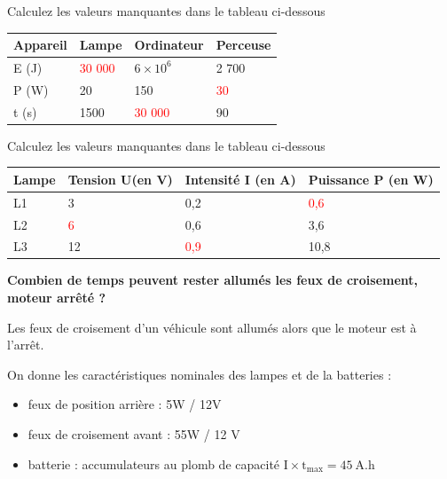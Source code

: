 \documentclass[11pt,a4paper]{article}
\begin{document}
 Calculez les valeurs manquantes dans le tableau ci-dessous \\\begin{center}
    

    \begin{tabular}{|p{3cm}|C{2cm}|C{2cm}|C{2cm}|}
         \hline
         Appareil & Lampe & Ordinateur & Perceuse \\
         \hline 
         E (J) & \textcolor{red}{30 000}  & $6\times10^6$ & 2 700 \\
         \hline
         P (W) & 20 & 150 & \textcolor{red}{30} \\
         \hline 
         t (s) & 1500 & \textcolor{red}{30 000} & 90 \\
         \hline
         

    \end{tabular}\end{center}

    \vfill 
    
 Calculez les valeurs manquantes dans le tableau ci-dessous \\\begin{center}
    

    \begin{tabular}{|p{2cm}|C{2cm}|C{2cm}|C{2cm}|}
         \hline
         Lampe & Tension U(en V) & Intensité I (en A)  & Puissance P (en W) \\
         \hline 
         L1 &  3 & 0,2  & \textcolor{red}{0,6} \\
         \hline
         L2 & \textcolor{red}{6} & 0,6 & 3,6 \\
         \hline 
         L3 & 12 & \textcolor{red}{0,9} & 10,8 \\
         \hline
         

    \end{tabular}\end{center}
\newpage

\begin{center}
    
\textbf{Combien de temps peuvent rester allumés les feux de croisement, moteur arrêté ? }
\end{center}

Les feux de croisement d'un véhicule sont allumés alors que le moteur est à l'arrêt.  

On donne les caractéristiques nominales des lampes et de la batteries : 
\begin{itemize}
    \item feux de position arrière : 5W / 12V 
    \item feux de croisement avant : 55W / 12 V
    \item batterie : accumulateurs au plomb de capacité $\mathrm{I \times t_{max} = 45 ~A.h}$
\end{itemize}
\end{document}
